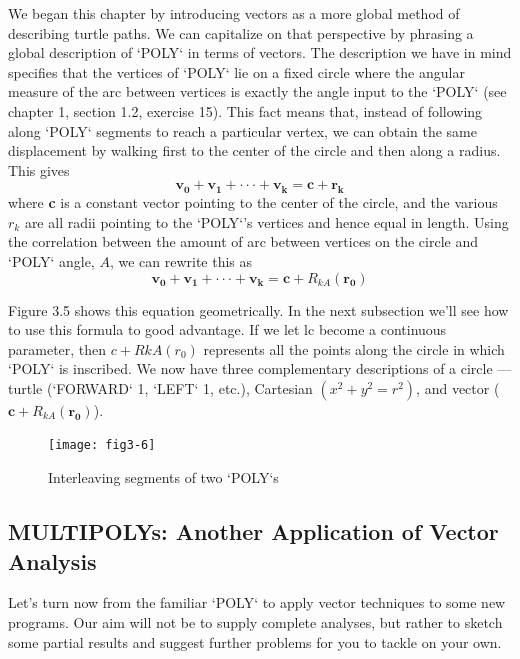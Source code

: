 \documentclass{book}
\begin{document}
We began this chapter by introducing vectors as a more global method
of describing turtle paths. We can capitalize on that perspective by
phrasing a global description of \textsc{`POLY`} in terms of vectors. The description
we have in mind specifies that the vertices of \textsc{`POLY`} lie on a fixed circle
where the angular measure of the arc between vertices is exactly the
angle input to the \textsc{`POLY`} (see chapter 1, section 1.2, exercise 15). This
fact means that, instead of following along \textsc{`POLY`} segments to reach a
particular vertex, we can obtain the same displacement by walking first
to the center of the circle and then along a radius. This gives
$$\mathbf{v_0} + \mathbf{v_1} + \cdot \cdot \cdot + \mathbf{v_k} = \mathbf{c} + \mathbf{r_k}$$
\noindent where \textbf{c} is a constant vector pointing to the center of the circle, and the
various \textbf{$r_k$} are all radii pointing to the \textsc{`POLY`}'s vertices and hence equal
in length. Using the correlation between the amount of arc between
vertices on the circle and \textsc{`POLY`} angle, $A$, we can rewrite this as
$$\mathbf{v_0} + \mathbf{v_1} + \cdot \cdot \cdot + \mathbf{v_k} = \mathbf{c} + R_{kA}(\mathbf{r_0})$$

Figure 3.5 shows this equation geometrically. In the next subsection
we'll see how to use this formula to good advantage.
If we let lc become a continuous parameter, then $c+RkA(r_0)$ represents
all the points along the circle in which \textsc{`POLY`} is inscribed. We now
have three complementary descriptions of a circle --- turtle (\textsc{`FORWARD`} 1,
\textsc{`LEFT`} 1, etc.), Cartesian $(x^2 + y^2 = r^2)$, and vector ($\mathbf{c} + R_{kA}(\mathbf{r_0})$).

\begin{figure}
\begin{center}
\texttt{[image: fig3-6]}
\caption{Interleaving segments of two \textsc{`POLY`}s}
\end{center}
\end{figure}

\subsection{MULTIPOLYs: Another Application of Vector Analysis}

Let's turn now from the familiar \textsc{`POLY`} to apply vector techniques to
some new programs. Our aim will not be to supply complete analyses,
but rather to sketch some partial results and suggest further problems
for you to tackle on your own.
\end{document}
